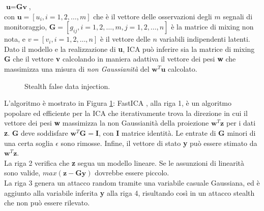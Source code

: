 \indent $\textbf{u} = \textbf{Gv}$,\\
con $\textbf{u} = [u_i, i = 1,2, \ldots, m]$ che è il vettore delle osservazioni degli $m$ segnali di monitoraggio, $\textbf{G} = [g_{ij}, i = 1, 2, \ldots,m, j = 1 ,2, \ldots, n]$ è la matrice di mixing non nota, e $v = [v_i, i = 1, 2, \ldots, n]$ è il vettore delle $n$ variabili indipendenti latenti.\\
Dato il modello e la realizzazione di \textbf{u}, ICA può inferire sia la matrice di mixing \textbf{G} che il vettore \textbf{v} calcolando in maniera adattiva il vettore dei pesi \textbf{w} che massimizza una misura di \emph{non Gaussianità} del $\textbf{w}^T\textbf{u}$ calcolato.\\
\begin{figure}[htbp]
	\centering
	\caption{Stealth false data injection.}
	\label{algo1}
\end{figure}
L'algoritmo è mostrato in Figura \ref{algo1}: FastICA \cite{lica}, alla riga 1, è un algoritmo popolare ed efficiente per la ICA che iterativamente trova la direzione in cui il vettore dei pesi \textbf{w} massimizza la non Gaussianità della proiezione $\textbf{w}^T\textbf{z}$ per i dati \textbf{z}. \textbf{G} deve soddisfare $\textbf{w}^T\textbf{G} = \textbf{I}$, con \textbf{I} matrice identità. Le entrate di \textbf{G} minori di una certa soglia $\epsilon$ sono rimosse. Infine, il vettore di stato \textbf{y} può essere stimato da $\textbf{w}^T\textbf{z}$.\\
La riga 2 verifica che \textbf{z} segua un modello lineare. Se le assunzioni di linearità sono valide, $max(\textbf{z} - \textbf{Gy})$ dovrebbe essere piccolo.\\
La riga 3 genera un attacco random tramite una variabile casuale Gaussiana, ed è aggiunto alla variabile inferita \textbf{y} alla riga 4, risultando così in un attacco stealth che non può essere rilevato.


